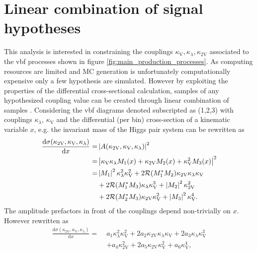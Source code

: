 \section{Linear combination of signal hypotheses}\label{sec:linear_combination}
\newcommand{\kl}{\kappa_\lambda}
\newcommand{\kt}{\kappa_t}
\newcommand{\kvv}{\kappa_\text{2V}}
\newcommand{\kv}{\kappa_\text{V}}
\newcommand{\mhh}{m_\text{HH}}

This analysis is interested in constraining the couplings $\kappa_\text{V},\kappa_\lambda,\kappa_\text{2V}$ associated to the \ac{vbf} processes shown in figure \ref{fig:main_production_processes}. As computing resources are limited and MC generation is unfortunately computationally expensive only a few hypothesis are simulated. However by exploiting the properties of the differential cross-sectional calculation, samples of any hypothesized coupling value can be created through linear combination of samples \citep{ATLAS-CONF-2019-049}. Considering the \ac{vbf} diagrams denoted subscripted as (1,2,3) with couplings $\kl$, $\kv$ and \ktwov the differential (per bin) cross-section of a kinematic variable $x$, e.g. the invariant mass of the Higgs pair system can be rewritten as
\begin{align}
    \label{eqn:xsec_vbf}
    \frac{\mathrm{d}\sigma(\kvv, \kv, \kl )}{\mathrm{d} x } = &
    \left| A(\kvv, \kv, \kl ) \right|^2                                                                                               \\
    =                                                         & \left| \kv \kl M_1(x    ) + \kvv M_2(x  ) + \kv^2 M_3(x   ) \right|^2 \\
    =                                                         & \abs{M_1}^2 \kl^2 \kv^2  + 2 \mathcal{R}(M_{1}^* M_{2})  \kvv \kl \kv \\
                                                              & + 2 \mathcal{R}(M_{1}^* M_{3}) \kl \kv^3 + \abs{M_2}^2  \kvv^2        \\
                                                              & + 2 \mathcal{R}(M_{2}^* M_{3}) \kvv \kv^2 + \abs{M_3}^2 \kv^4.
\end{align}
The amplitude prefactors in front of the couplings depend non-trivially on $x$. However
rewritten as
\begin{align}\label{eq:reweight}
    \frac{\mathrm{d}\sigma(\kvv, \kv, \kl )}{\mathrm{d} x}
    = \; & a_1 \kl^2 \kv^2  + 2 a_2 \kvv \kl \kv  + 2 a_3 \kl \kv^3  \\
         & + a_4 \kvv^2     + 2 a_5 \kvv \kv^2 + a_6\kv^4, \nonumber
\end{align}
